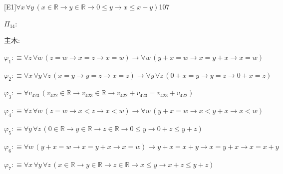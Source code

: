 \begin{fullproof}{[E1]}{$\forall x\,\forall y\,(x \in \mathbb{R} \to y \in \mathbb{R} \to 0 \leq y \to x \leq x + y)$}{107}
\begin{ptree}
\end{ptree}
\noindent$\Pi_{14}$:
\begin{ptree}
\noLine
{}
\end{ptree}
\noindent 主木:
\begin{ptree}
\noLine
{}
\end{ptree}
\begin{abbrevlist}
\item $\varphi_{1} :\equiv \forall z\,\forall w\,(z = w \to x = z \to x = w) \to \forall w\,(y + x = w \to x = y + x \to x = w)$
\item $\varphi_{2} :\equiv \forall x\,\forall y\,\forall z\,(x = y \to y = z \to x = z) \to \forall y\,\forall z\,(0 + x = y \to y = z \to 0 + x = z)$
\item $\varphi_{3} :\equiv \forall v_{423}\,(v_{422} \in \mathbb{R} \to v_{423} \in \mathbb{R} \to v_{422} + v_{423} = v_{423} + v_{422})$
\item $\varphi_{4} :\equiv \forall z\,\forall w\,(z = w \to x < z \to x < w) \to \forall w\,(y + x = w \to x < y + x \to x < w)$
\item $\varphi_{5} :\equiv \forall y\,\forall z\,(0 \in \mathbb{R} \to y \in \mathbb{R} \to z \in \mathbb{R} \to 0 \leq y \to 0 + z \leq y + z)$
\item $\varphi_{6} :\equiv \forall w\,(y + x = w \to x = y + x \to x = w) \to y + x = x + y \to x = y + x \to x = x + y$
\item $\varphi_{7} :\equiv \forall x\,\forall y\,\forall z\,(x \in \mathbb{R} \to y \in \mathbb{R} \to z \in \mathbb{R} \to x \leq y \to x + z \leq y + z)$

\end{abbrevlist}
\end{fullproof}
